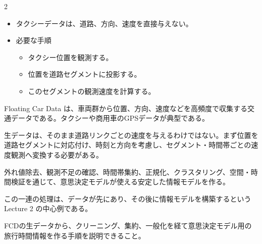 \begin{multicols}{2}

\footnotesize

\raggedcolumns


\begin{itemize}
\item タクシーデータは、道路、方向、速度を直接与えない。
\item 必要な手順
\begin{itemize}
\item タクシー位置を観測する。
\item 位置を道路セグメントに投影する。
\item このセグメントの観測速度を計算する。
\end{itemize}
\end{itemize}

Floating Car Data は、車両群から位置、方向、速度などを高頻度で収集する交通データである。タクシーや商用車のGPSデータが典型である。\par

生データは、そのまま道路リンクごとの速度を与えるわけではない。まず位置を道路セグメントに対応付け、時刻と方向を考慮し、セグメント・時間帯ごとの速度観測へ変換する必要がある。\par

外れ値除去、観測不足の確認、時間帯集約、正規化、クラスタリング、空間・時間検証を通じて、意思決定モデルが使える安定した情報モデルを作る。\par

この一連の処理は、データが先にあり、その後に情報モデルを構築するという Lecture 2 の中心例である。\par

FCDの生データから、クリーニング、集約、一般化を経て意思決定モデル用の旅行時間情報を作る手順を説明できること。\par



\end{multicols}
